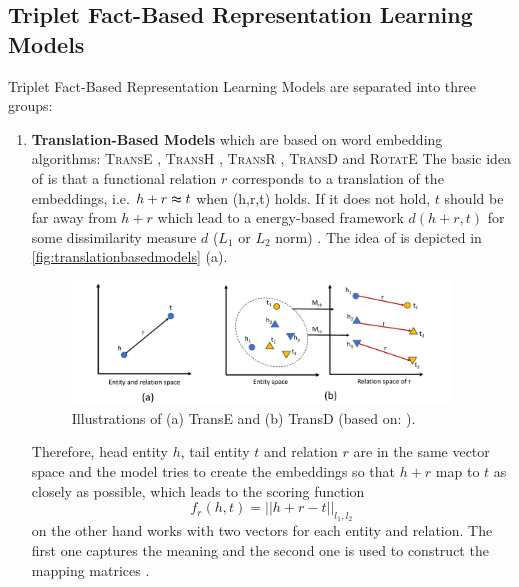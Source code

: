 \subsection{Triplet Fact-Based Representation Learning Models} 
\label{subsec:triplet_fact_based_representation_learning_models}


Triplet Fact-Based Representation Learning Models are separated into three groups:
\begin{enumerate}
    \item 
    \textbf{Translation-Based Models}  which are based on word embedding algorithms: 
    \textsc{TransE} \cite{TransE}, \textsc{TransH} \cite{TransH}, \textsc{TransR} \cite{TransR}, \textsc{TransD} \cite{TransD}
    and 
    \textsc{RotatE} \cite{RotatE}
    The basic idea of \transe is that a functional relation $r$ corresponds to a translation of the embeddings, i.e. $h + r \thickapprox t$ when (h,r,t) holds.
    If it does not hold, $t$ should be far away from $h + r$ which lead to a energy-based framework $d(h+r, t)$ for some dissimilarity measure $d$ ($L_1$ or $L_2$ norm) \cite{TransE}.
    The idea of \transe is depicted in \autoref{fig:translationbasedmodels} (a).
    \begin{figure}[t]
      \centering
        \includegraphics[width=0.95\textwidth]{figures/Transe+TransD.pdf}
      \caption{Illustrations of (a) TransE and (b) TransD (based on: \cite{electronics9050750}).}
      \label{fig:translationbasedmodels}
    \end{figure}
    Therefore, head entity $h$, tail entity $t$ and relation $r$ are in the same vector space and the model tries to create the embeddings so that $h+r$ map to $t$ as closely as possible, which leads to the scoring function
    \begin{equation}
        f_r(h,t) = || h + r - t ||_{l_1, l_2}
        \label{eq:transescoringfunction}
    \end{equation}
    \transd on the other hand works with two vectors for each entity and relation.
    The first one captures the meaning and the second one is used to construct the mapping matrices \cite{TransD}.


\end{enumerate}
